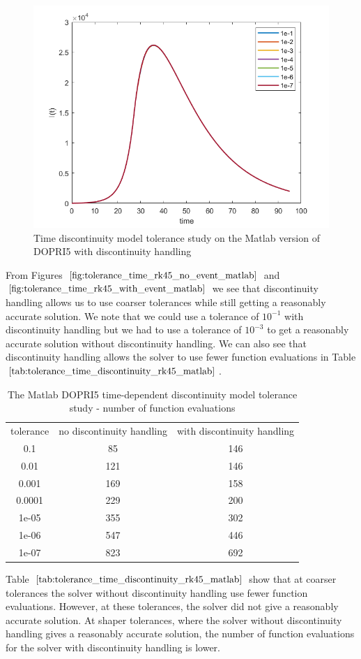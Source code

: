 \begin{figure}[H]
\centering
\includegraphics[width=0.7\linewidth]{./figures/tolerance_time_rk45_with_event_matlab}
\caption{Time discontinuity model tolerance study on the Matlab version of DOPRI5 with discontinuity handling}
\label{fig:tolerance_time_rk45_with_event_matlab}
\end{figure}

From Figures $\ref{fig:tolerance_time_rk45_no_event_matlab}$ and $\ref{fig:tolerance_time_rk45_with_event_matlab}$ we see that discontinuity handling allows us to use coarser tolerances while still getting a reasonably accurate solution. We note that we could use a tolerance of $10^{-1}$ with discontinuity handling but we had to use a tolerance of $10^{-3}$ to get a reasonably accurate solution without discontinuity handling. We can also see that discontinuity handling allows the solver to use fewer function evaluations in Table $\ref{tab:tolerance_time_discontinuity_rk45_matlab}$.

\begin{table}[H]
\caption {The Matlab DOPRI5 time-dependent discontinuity model tolerance study - number of function evaluations} 
\label{tab:tolerance_time_discontinuity_rk45_matlab} 
\begin{center}
\begin{tabular}{ c c c }
tolerance & no discontinuity handling & with discontinuity handling\\ 
0.1 & 85 & 146 \\
0.01 & 121 & 146 \\
0.001 & 169 & 158 \\
0.0001 & 229 & 200 \\
1e-05 & 355 & 302 \\
1e-06 & 547 & 446 \\
1e-07 & 823 & 692 \\
\end{tabular}
\end{center}
\end{table}

Table $\ref{tab:tolerance_time_discontinuity_rk45_matlab}$ show that at coarser tolerances the solver without discontinuity handling use fewer function evaluations. However, at these tolerances, the solver did not give a reasonably accurate solution. At shaper tolerances, where the solver without discontinuity handling gives a reasonably accurate solution, the number of function evaluations for the solver with discontinuity handling is lower.
